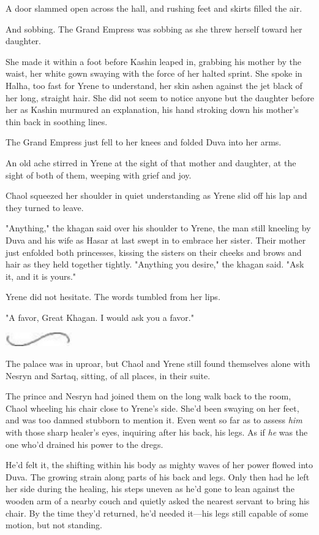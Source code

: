 A door slammed open across the hall, and rushing feet and skirts filled the air.

And sobbing. The Grand Empress was sobbing as she threw herself toward her daughter.

She made it within a foot before Kashin leaped in, grabbing his mother by the waist, her white gown swaying with the force of her halted sprint. She spoke in Halha, too fast for Yrene to understand, her skin ashen against the jet black of her long, straight hair. She did not seem to notice anyone but the daughter before her as Kashin murmured an explanation, his hand stroking down his mother's thin back in soothing lines.

The Grand Empress just fell to her knees and folded Duva into her arms.

An old ache stirred in Yrene at the sight of that mother and daughter, at the sight of both of them, weeping with grief and joy.

Chaol squeezed her shoulder in quiet understanding as Yrene slid off his lap and they turned to leave.

"Anything," the khagan said over his shoulder to Yrene, the man still kneeling by Duva and his wife as Hasar at last swept in to embrace her sister. Their mother just enfolded both princesses, kissing the sisters on their cheeks and brows and hair as they held together tightly. "Anything you desire," the khagan said. "Ask it, and it is yours."

Yrene did not hesitate. The words tumbled from her lips.

"A favor, Great Khagan. I would ask you a favor."

\includegraphics[width=1.12in,height=0.24in]{images/seperator}

The palace was in uproar, but Chaol and Yrene still found themselves alone with Nesryn and Sartaq, sitting, of all places, in their suite.

The prince and Nesryn had joined them on the long walk back to the room, Chaol wheeling his chair close to Yrene's side. She'd been swaying on her feet, and was too damned stubborn to mention it. Even went so far as to assess \emph{him} with those sharp healer's eyes, inquiring after his back, his legs. As if \emph{he} was the one who'd drained his power to the dregs.

He'd felt it, the shifting within his body as mighty waves of her power flowed into Duva. The growing strain along parts of his back and legs. Only then had he left her side during the healing, his steps uneven as he'd gone to lean against the wooden arm of a nearby couch and quietly asked the nearest servant to bring his chair. By the time they'd returned, he'd needed it---his legs still capable of some motion, but not standing.

